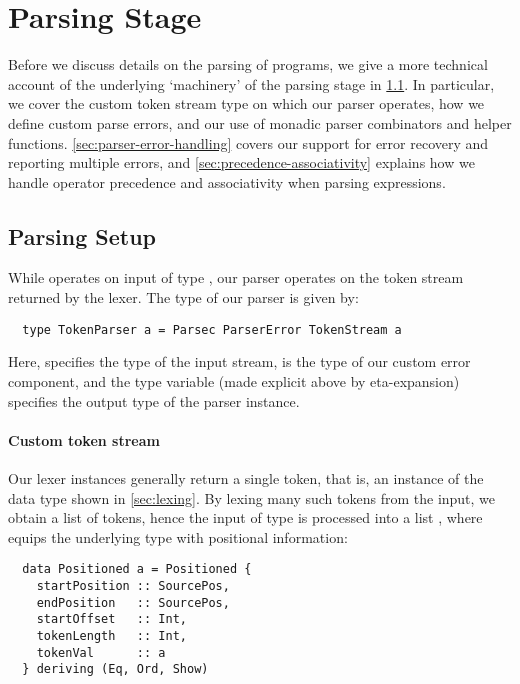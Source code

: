




\section{Parsing Stage} \label{sec:parsing}

Before we discuss details on the parsing of programs, we give a more technical
account of the underlying `machinery' of the parsing stage in
\cref{sec:parsing-setup}. In particular, we cover the custom token stream type
on which our parser operates, how we define custom parse errors, and our use of
monadic parser combinators and helper functions.
\cref{sec:parser-error-handling} covers our support for error recovery and
reporting multiple errors, and \cref{sec:precedence-associativity} explains how
we handle operator precedence and associativity when parsing expressions.


\subsection{Parsing Setup} \label{sec:parsing-setup}

While  operates on input of type , our parser
 operates on the token stream returned by the lexer.
The type of our parser is given by:
%
\begin{verbatim}
  type TokenParser a = Parsec ParserError TokenStream a
\end{verbatim}
Here,  specifies the type of the input stream,
 is the type of our custom error component, and the type
variable  (made explicit above by eta-expansion) specifies the output
type of the parser instance.


\paragraph{Custom token stream}

Our lexer instances generally return a single token, that is, an instance of
the  data type shown in \cref{sec:lexing}. By lexing many such
tokens from the input, we obtain a list of tokens, hence the input of type
 is processed into a list ,
where  equips the underlying type  with positional
information:
\begin{verbatim}
  data Positioned a = Positioned {
    startPosition :: SourcePos,
    endPosition   :: SourcePos,
    startOffset   :: Int,
    tokenLength   :: Int,
    tokenVal      :: a
  } deriving (Eq, Ord, Show)
\end{verbatim}


